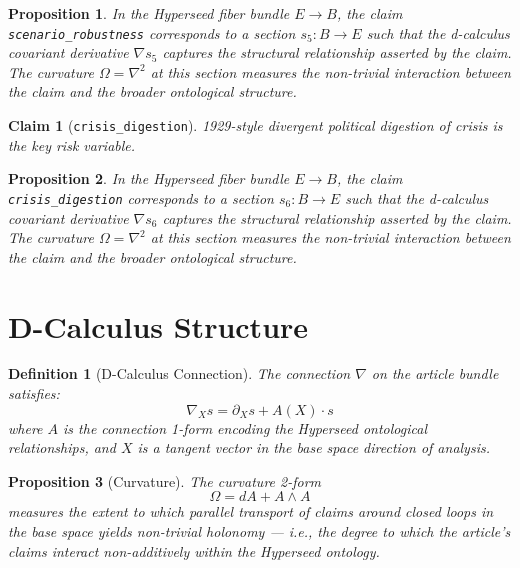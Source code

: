 \documentclass{article}
\newtheorem{claim}{Claim}
\newtheorem{definition}{Definition}
\newtheorem{proposition}{Proposition}
\begin{document}
\begin{proposition}
In the Hyperseed fiber bundle $E \to B$, the claim \texttt{scenario_robustness} corresponds to a section $s_5: B \to E$ such that the d-calculus covariant derivative $\nabla s_5$ captures the structural relationship asserted by the claim. The curvature $\Omega = \nabla^2$ at this section measures the non-trivial interaction between the claim and the broader ontological structure.
\end{proposition}

\begin{claim}[\texttt{crisis_digestion}]
1929-style divergent political digestion of crisis is the key risk variable.
\end{claim}

\begin{proposition}
In the Hyperseed fiber bundle $E \to B$, the claim \texttt{crisis_digestion} corresponds to a section $s_6: B \to E$ such that the d-calculus covariant derivative $\nabla s_6$ captures the structural relationship asserted by the claim. The curvature $\Omega = \nabla^2$ at this section measures the non-trivial interaction between the claim and the broader ontological structure.
\end{proposition}

\section{D-Calculus Structure}

\begin{definition}[D-Calculus Connection]
The connection $\nabla$ on the article bundle satisfies:
\begin{equation}
  \nabla_X s = \partial_X s + A(X) \cdot s
\end{equation}
where $A$ is the connection 1-form encoding the Hyperseed ontological relationships, and $X$ is a tangent vector in the base space direction of analysis.
\end{definition}

\begin{proposition}[Curvature]
The curvature 2-form
\begin{equation}
  \Omega = dA + A \wedge A
\end{equation}
measures the extent to which parallel transport of claims around closed loops in the base space yields non-trivial holonomy --- i.e., the degree to which the article's claims interact non-additively within the Hyperseed ontology.
\end{proposition}
\end{document}
